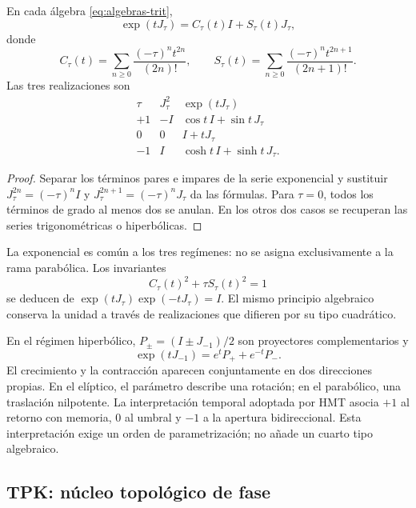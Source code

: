 \begin{proposition}
En cada álgebra \eqref{eq:algebras-trit},
\begin{equation}
 \exp(tJ_\tau)=C_\tau(t)I+S_\tau(t)J_\tau,
\end{equation}
donde
\[
 C_\tau(t)=\sum_{n\ge0}\frac{(-\tau)^nt^{2n}}{(2n)!},\qquad
 S_\tau(t)=\sum_{n\ge0}\frac{(-\tau)^nt^{2n+1}}{(2n+1)!}.
\]
Las tres realizaciones son
\[
 \begin{array}{c|c|c}
 \tau&J_\tau^2&\exp(tJ_\tau)\\\hline
 +1&-I&\cos t\,I+\sin t\,J_\tau\\
 0&0&I+tJ_\tau\\
 -1&I&\cosh t\,I+\sinh t\,J_\tau.
 \end{array}
\]
\end{proposition}
\begin{proof}
Separar los términos pares e impares de la serie exponencial y sustituir \(J_\tau^{2n}=(-\tau)^nI\) y \(J_\tau^{2n+1}=(-\tau)^nJ_\tau\) da las fórmulas. Para \(\tau=0\), todos los términos de grado al menos dos se anulan. En los otros dos casos se recuperan las series trigonométricas o hiperbólicas.
\end{proof}

La exponencial es común a los tres regímenes: no se asigna exclusivamente a la rama parabólica. Los invariantes
\[
 C_\tau(t)^2+\tau S_\tau(t)^2=1
\]
se deducen de \(\exp(tJ_\tau)\exp(-tJ_\tau)=I\). El mismo principio algebraico conserva la unidad a través de realizaciones que difieren por su tipo cuadrático.

En el régimen hiperbólico, \(P_\pm=(I\pm J_{-1})/2\) son proyectores complementarios y
\[
 \exp(tJ_{-1})=e^tP_++e^{-t}P_-.
\]
El crecimiento y la contracción aparecen conjuntamente en dos direcciones propias. En el elíptico, el parámetro describe una rotación; en el parabólico, una traslación nilpotente. La interpretación temporal adoptada por HMT asocia \(+1\) al retorno con memoria, \(0\) al umbral y \(-1\) a la apertura bidireccional. Esta interpretación exige un orden de parametrización; no añade un cuarto tipo algebraico.





\newpage
\subsection{TPK: núcleo topológico de fase}

